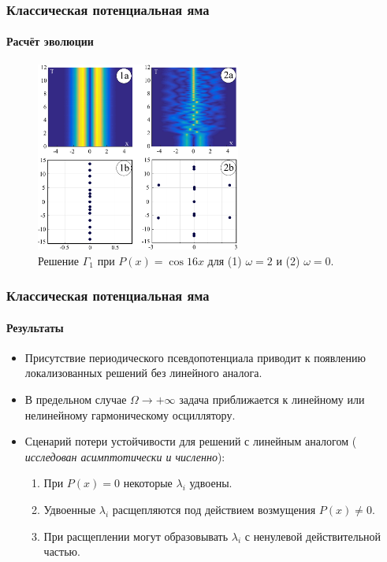 \documentclass [10pt] {beamer}
\begin{document}
\begin{frame}
	\frametitle{Классическая потенциальная яма}
	\framesubtitle{Расчёт эволюции}
	
	\begin{figure}
		\includegraphics[width=0.6\textwidth]{pic/evolution.pdf}
		\caption{Решение $\Gamma_1$ при $P(x) = \cos 16 x$ для {\color{ceruleanblue} (1)} $\omega = 2$ и {\color{ceruleanblue} (2)} $\omega = 0$.}
		\label{pic:evolution}
	\end{figure}
\end{frame}

\begin{frame}
	\frametitle{Классическая потенциальная яма}
	\framesubtitle{Результаты}
	
	\begin{itemize}
		\item Присутствие периодического псевдопотенциала приводит к появлению локализованных решений без линейного аналога.
		\item В предельном случае $\Omega \to +\infty$ задача приближается к линейному или нелинейному гармоническому осциллятору.
		\item Сценарий потери устойчивости для решений с линейным аналогом ({\it {\color{ceruleanblue} исследован асимптотически и численно}}):
		\begin{enumerate}
			\item При $P(x) = 0$ некоторые $\lambda_i$ удвоены.
			\item Удвоенные $\lambda_i$ расщепляются под действием возмущения $P(x) \neq 0$.
			\item При расщеплении могут образовывать $\lambda_i$ с ненулевой действительной частью.
		\end{enumerate}
	\end{itemize}
\end{frame}
\end{document}
